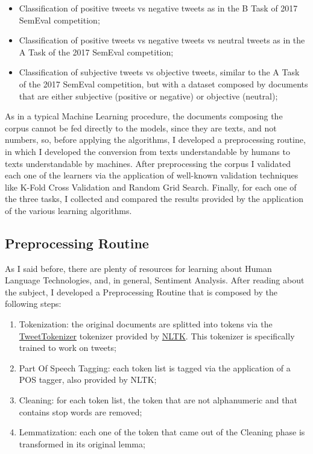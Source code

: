 \documentclass[11pt,twocolumn]{article}
\begin{document}
        \begin{itemize}
            \item Classification of positive tweets vs negative tweets as in the B Task of 2017 SemEval
            competition;
            \item Classification of positive tweets vs negative tweets vs neutral tweets as in the A Task of the
            2017 SemEval competition;
            \item Classification of subjective tweets vs objective tweets, similar to the A Task of the 2017
            SemEval competition, but with a dataset composed by documents that are either subjective
            (positive or negative) or objective (neutral);
        \end{itemize}

        \noindent
        As in a typical Machine Learning procedure, the documents composing the corpus cannot be fed directly to
        the models, since they are texts, and not numbers, so, before applying the algorithms, I developed a
        preprocessing routine, in which I developed the conversion from texts understandable by humans to texts
        understandable by machines. After preprocessing the corpus I validated each one of the learners via the
        application of well-known validation techniques like K-Fold Cross Validation and Random Grid Search.
        Finally, for each one of the three tasks, I collected and compared the results provided by the
        application of the various learning algorithms.

        \subsection{Preprocessing Routine} %
        \label{sub:preprocessing_routine}
            As I said before, there are plenty of resources for learning about Human Language Technologies, and,
            in general, Sentiment Analysis. After reading about the subject, I developed a Preprocessing
            Routine that is composed by the following steps:

            \begin{enumerate}
                \item Tokenization: the original documents are splitted into tokens via the
                \href{https://www.nltk.org/api/nltk.tokenize.html#module-nltk.tokenize}{TweetTokenizer}
                tokenizer provided by \href{https://www.nltk.org/py-modindex.html}{NLTK}. This tokenizer is
                specifically trained to work on tweets;
                \item Part Of Speech Tagging: each token list is tagged via the application of a POS
                tagger, also provided by NLTK;
                \item Cleaning: for each token list, the token that are not alphanumeric and that contains
                stop words are removed;
                \item Lemmatization: each one of the token that came out of the Cleaning phase is transformed
                in its original lemma;
            \end{enumerate}
\end{document}
